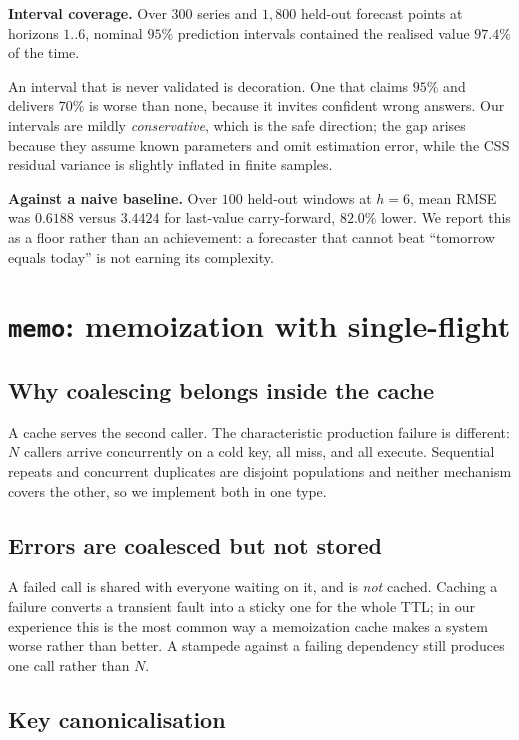 \documentclass[10pt,twocolumn]{article}
\begin{document}
\noindent\textbf{Interval coverage.} Over $300$ series and $1{,}800$ held-out
forecast points at horizons $1..6$, nominal $95\%$ prediction intervals contained
the realised value $97.4\%$ of the time.

An interval that is never validated is decoration. One that claims $95\%$ and
delivers $70\%$ is worse than none, because it invites confident wrong answers.
Our intervals are mildly \emph{conservative}, which is the safe direction; the
gap arises because they assume known parameters and omit estimation error, while
the CSS residual variance is slightly inflated in finite samples.

\noindent\textbf{Against a naive baseline.} Over $100$ held-out windows at
$h{=}6$, mean RMSE was $0.6188$ versus $3.4424$ for last-value carry-forward,
$82.0\%$ lower. We report this as a floor rather than an achievement: a
forecaster that cannot beat ``tomorrow equals today'' is not earning its
complexity.

\section{\texttt{memo}: memoization with single-flight}
\label{sec:memo}

\subsection{Why coalescing belongs inside the cache}

A cache serves the second caller. The characteristic production failure is
different: $N$ callers arrive concurrently on a cold key, all miss, and all
execute. Sequential repeats and concurrent duplicates are disjoint populations
and neither mechanism covers the other, so we implement both in one type.

\subsection{Errors are coalesced but not stored}

A failed call is shared with everyone waiting on it, and is \emph{not} cached.
Caching a failure converts a transient fault into a sticky one for the whole TTL;
in our experience this is the most common way a memoization cache makes a system
worse rather than better. A stampede against a failing dependency still produces
one call rather than $N$.

\subsection{Key canonicalisation}
\end{document}
